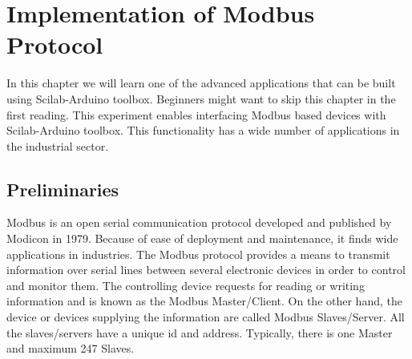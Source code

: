 \chapter {Implementation of Modbus Protocol}
\thispagestyle{empty}
\label{modbus}

\newcommand{\LocMODfig}{\Origin/user-code/modbus/figures}
\newcommand{\LocMODscicode}{\Origin/user-code/modbus/scilab}
\newcommand{\LocMODscibrief}[1]{{\tt \seqsplit{%
Origin/user-code/modbus/scilab}}, see \fnrefp{fn:file-loc}}
\newcommand{\LocMODardcode}{\Origin/user-code/modbus/arduino}
\newcommand{\LocMODardbrief}[1]{{\tt \seqsplit{%
Origin/user-code/modbus/arduino}}, see \fnrefp{fn:file-loc}}

\newcommand{\LocMODpycode}{\Origin/user-code/modbus/python}
\newcommand{\LocMODpybrief}[1]{{\tt \seqsplit{%
Origin/user-code/modbus/python}}, see \fnrefp{fn:file-loc}}


\newcommand{\LocMODjuliacode}{\Origin/user-code/modbus/julia}
\newcommand{\LocMODjuliabrief}[1]{{\tt \seqsplit{%
Origin/user-code/modbus/julia}}, see \fnrefp{fn:file-loc}}




\newcommand{\LocMODOpenModelicacode}{\Origin/user-code/modbus/OpenModelica}
\newcommand{\LocMODOpenModelicabrief}[1]{{\tt \seqsplit{%
Origin/user-code/modbus/OpenModelica}}, see \fnrefp{fn:file-loc}}


In this chapter we will learn one of the advanced applications that can be built using Scilab-Arduino toolbox. Beginners might want to skip this chapter in the first reading. This experiment enables interfacing Modbus based devices with Scilab-Arduino toolbox. This functionality has a wide number of applications in the industrial sector.

\section{Preliminaries}
Modbus is an open serial communication protocol developed and published by Modicon in 1979. Because of ease of deployment and maintenance, it finds wide applications in industries. The Modbus protocol provides a means to transmit information over serial lines between several electronic devices in order to control and monitor them. The controlling device requests for reading or writing information and is known as the Modbus Master/Client. On the other hand, the device or devices supplying the information are called Modbus Slaves/Server. All the slaves/servers have a unique id and address. Typically, there is one Master and maximum 247 Slaves.

